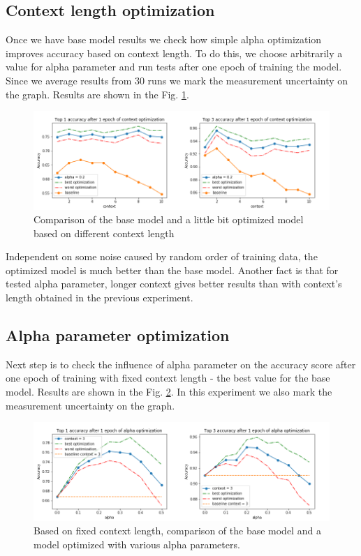 \documentclass{llncs}
\begin{document}
\subsection{Context length optimization}
Once we have base model results we check how simple alpha optimization improves accuracy based on context length. To do this, we choose arbitrarily a value for alpha parameter and run tests after one epoch of training the model. Since we average results from 30 runs we mark the measurement uncertainty on the graph. Results are shown in the Fig. \ref{fig:exp1}.
\begin{figure}
    \label{fig:exp1}
    \caption{Comparison of the base model and a little bit optimized model based on different context length}
    \includegraphics[scale=0.6]{res/exp1_context_top_acc.png}
\end{figure}
Independent on some noise caused by random order of training data, the optimized model is much better than the base model. Another fact is that for tested alpha parameter, longer context gives better results than with context's length obtained in the previous experiment.

\subsection{Alpha parameter optimization}
Next step is to check the influence of alpha parameter on the accuracy score after one epoch of training with fixed context length - the best value for the base model. Results are shown in the Fig. \ref{fig:exp2}. In this experiment we also mark the measurement uncertainty on the graph.

\begin{figure}
    \label{fig:exp2}
    \caption{Based on fixed context length, comparison of the base model and a model optimized with various alpha parameters. }
    \includegraphics[scale=0.6]{res/exp2_alpha_top_acc.png}
\end{figure}
\end{document}
